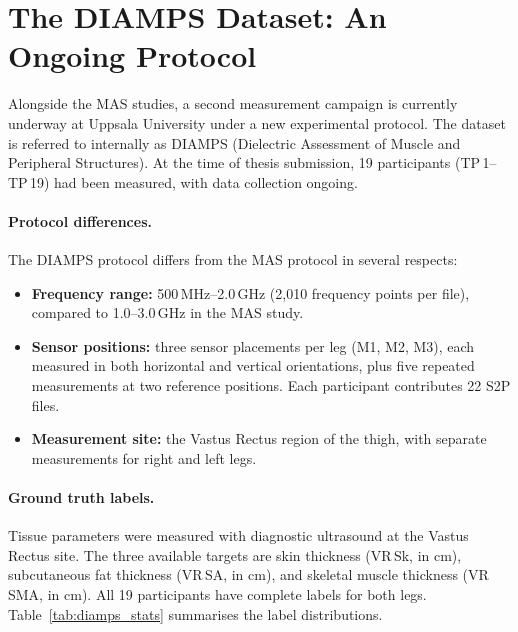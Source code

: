 \documentclass[12pt, a4paper, oneside]{report}
\begin{document}
\section{The DIAMPS Dataset: An Ongoing Protocol}
\label{sec:diamps}

Alongside the MAS studies, a second measurement campaign is currently underway at Uppsala University under a new experimental protocol. The dataset is referred to internally as DIAMPS (Dielectric Assessment of Muscle and Peripheral Structures). At the time of thesis submission, 19 participants (TP\,1--TP\,19) had been measured, with data collection ongoing.

\paragraph{Protocol differences.}
The DIAMPS protocol differs from the MAS protocol in several respects:

\begin{itemize}[noitemsep]
  \item \textbf{Frequency range:} 500\,MHz--2.0\,GHz (2,010 frequency points per file), compared to 1.0--3.0\,GHz in the MAS study.
  \item \textbf{Sensor positions:} three sensor placements per leg (M1, M2, M3), each measured in both horizontal and vertical orientations, plus five repeated measurements at two reference positions. Each participant contributes 22 S2P files.
  \item \textbf{Measurement site:} the Vastus Rectus region of the thigh, with separate measurements for right and left legs.
\end{itemize}

\paragraph{Ground truth labels.}
Tissue parameters were measured with diagnostic ultrasound at the Vastus Rectus site. The three available targets are skin thickness (VR\,Sk, in cm), subcutaneous fat thickness (VR\,SA, in cm), and skeletal muscle thickness (VR\,SMA, in cm). All 19 participants have complete labels for both legs. Table~\ref{tab:diamps_stats} summarises the label distributions.
\end{document}
